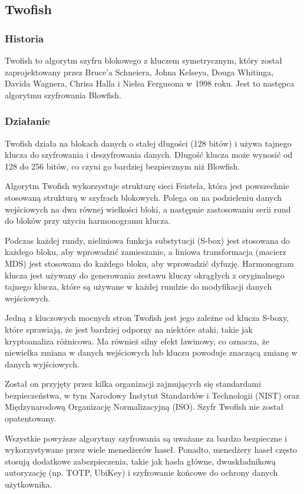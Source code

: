 \subsection{Twofish}
\subsubsection{Historia}
Twofish to algorytm szyfru blokowego z kluczem symetrycznym, który został zaprojektowany przez Bruce'a Schneiera, Johna Kelseya, Douga Whitinga, Davida Wagnera, Chrisa Halla i Nielsa Fergusona w 1998 roku. Jest to następca algorytmu szyfrowania Blowfish.
\subsubsection{Działanie}
Twofish działa na blokach danych o stałej długości (128 bitów) i używa tajnego klucza do szyfrowania i deszyfrowania danych. Długość klucza może wynosić od 128 do 256 bitów, co czyni go bardziej bezpiecznym niż Blowfish.

Algorytm Twofish wykorzystuje strukturę sieci Feistela, która jest powszechnie stosowaną strukturą w szyfrach blokowych. Polega on na podzieleniu danych wejściowych na dwa równej wielkości bloki, a następnie zastosowaniu serii rund do bloków przy użyciu harmonogramu klucza.

Podczas każdej rundy, nieliniowa funkcja substytucji (S-box) jest stosowana do każdego bloku, aby wprowadzić zamieszanie, a liniowa transformacja (macierz MDS) jest stosowana do każdego bloku, aby wprowadzić dyfuzję. Harmonogram klucza jest używany do generowania zestawu kluczy okrągłych z oryginalnego tajnego klucza, które są używane w każdej rundzie do modyfikacji danych wejściowych.

Jedną z kluczowych mocnych stron Twofish jest jego zależne od klucza S-boxy, które sprawiają, że jest bardziej odporny na niektóre ataki, takie jak kryptoanaliza różnicowa. Ma również silny efekt lawinowy, co oznacza, że niewielka zmiana w danych wejściowych lub kluczu powoduje znaczącą zmianę w danych wyjściowych.

Został on przyjęty przez kilka organizacji zajmujących się standardami bezpieczeństwa, w tym Narodowy Instytut Standardów i Technologii (NIST) oraz Międzynarodową Organizację Normalizacyjną (ISO). Szyfr Twofish nie został opatentowany. 


Wszystkie powyższe algorytmy szyfrowania są uważane za bardzo bezpieczne i wykorzystywane przez wiele menedżerów haseł. Ponadto, menedżery haseł często stosują dodatkowe zabezpieczenia, takie jak hasła główne, dwuskładnikową autoryzację (np. TOTP, UbiKey) i szyfrowanie końcowe do ochrony danych użytkownika.


